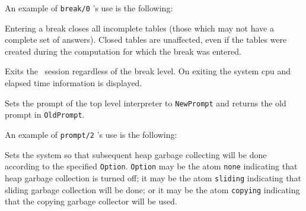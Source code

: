 \begin{description}
    An example of {\tt break/0} 's use is the following:


    Entering a break closes all incomplete tables (those which may not have a 
    complete set of answers).  Closed tables are unaffected, even if 
    the tables were created during the computation for which the break was
    entered.

    Exits the \ourprolog\ session regardless of the break level.  On exiting
    the system cpu and elapsed time information is displayed.

    Sets the prompt of the top level interpreter to {\tt NewPrompt} and 
    returns the old prompt in {\tt OldPrompt}.

    An example of {\tt prompt/2} 's use is the following:


    Sets the system so that subsequent heap garbage collecting will be
    done according to the specified {\tt Option}.  {\tt Option} may be
    the atom \verb|none| indicating that heap garbage collection is
    turned off; it may be the atom \verb|sliding| indicating that
    sliding garbage collection will be done; or it may be the atom
    \verb|copying| indicating that the copying garbage collector will
    be used.
 

\end{description}
